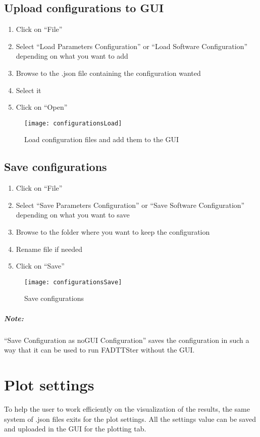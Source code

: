\documentclass[fadttsterUserGuide_master]{subfiles}
\begin{document}
	\subsection{Upload configurations to GUI}
	\begin{enumerate}
		\item Click on ``File''
		\item Select ``Load Parameters Configuration'' or ``Load Software Configuration'' depending on what you want to add
		\item Browse to the .json file containing the configuration wanted
		\item Select it
		\item Click on ``Open''
	\end{enumerate}
	\begin{figure}[!h]
		\centering
		\texttt{[image: configurationsLoad]}
		\caption{Load configuration files and add them to the GUI}
		\label{fig:configurationsLoad}
	\end{figure}
	\vfill
    \newpage
    
	\subsection{Save configurations}
	\begin{enumerate}
		\item Click on ``File''
		\item Select ``Save Parameters Configuration'' or ``Save Software Configuration'' depending on what you want to save
		\item Browse to the folder where you want to keep the configuration
		\item Rename file if needed
		\item Click on ``Save''
	\end{enumerate}
	\begin{figure}[H]
		\centering
		\texttt{[image: configurationsSave]}
		\caption{Save configurations}
		\label{fig:configurationsSave}
	\end{figure}
	\subparagraph{\textbf{Note:}} ``Save Configuration as noGUI Configuration'' saves the configuration in such a way that it can be used to run FADTTSter without the GUI.	
	\vfill
    \newpage
    
	\section{Plot settings}
	To help the user to work efficiently on the visualization of the results, the same system of .json files exits for the plot settings. All the settings value can be saved and uploaded in the GUI for the plotting tab.
	
\end{document}
